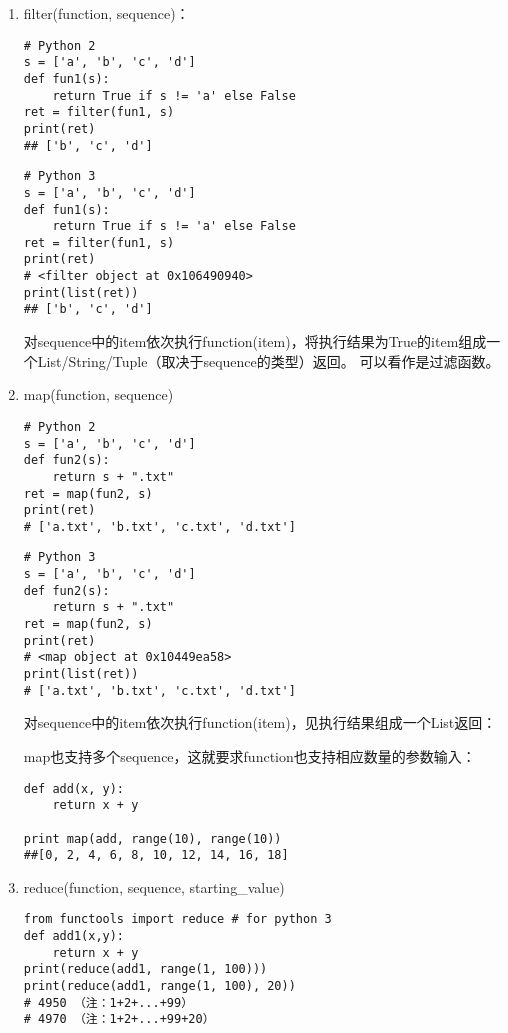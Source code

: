 \begin{enumerate}
\item filter(function, sequence)：
\begin{verbatim}
# Python 2
s = ['a', 'b', 'c', 'd']
def fun1(s):
    return True if s != 'a' else False
ret = filter(fun1, s)
print(ret)
## ['b', 'c', 'd']
\end{verbatim}

\begin{verbatim}
# Python 3
s = ['a', 'b', 'c', 'd']
def fun1(s):
    return True if s != 'a' else False
ret = filter(fun1, s)
print(ret)
# <filter object at 0x106490940>
print(list(ret))
## ['b', 'c', 'd']
\end{verbatim}

对sequence中的item依次执行function(item)，将执行结果为True的item组成一个List/String/Tuple（取决于sequence的类型）返回。
可以看作是过滤函数。

\item map(function, sequence) 
\begin{verbatim}
# Python 2
s = ['a', 'b', 'c', 'd'] 
def fun2(s):
    return s + ".txt"
ret = map(fun2, s)
print(ret)
# ['a.txt', 'b.txt', 'c.txt', 'd.txt']
\end{verbatim}


\newpage
\begin{verbatim}
# Python 3
s = ['a', 'b', 'c', 'd'] 
def fun2(s):
    return s + ".txt"
ret = map(fun2, s)
print(ret)
# <map object at 0x10449ea58>
print(list(ret))
# ['a.txt', 'b.txt', 'c.txt', 'd.txt']
\end{verbatim}

对sequence中的item依次执行function(item)，见执行结果组成一个List返回：

map也支持多个sequence，这就要求function也支持相应数量的参数输入：
\begin{verbatim}
def add(x, y):
    return x + y 

print map(add, range(10), range(10)) 
##[0, 2, 4, 6, 8, 10, 12, 14, 16, 18]
\end{verbatim}

\item reduce(function, sequence, starting\_value)
\begin{verbatim}
from functools import reduce # for python 3
def add1(x,y):
    return x + y
print(reduce(add1, range(1, 100)))
print(reduce(add1, range(1, 100), 20))
# 4950 （注：1+2+...+99）
# 4970 （注：1+2+...+99+20）
\end{verbatim}


\end{enumerate}
